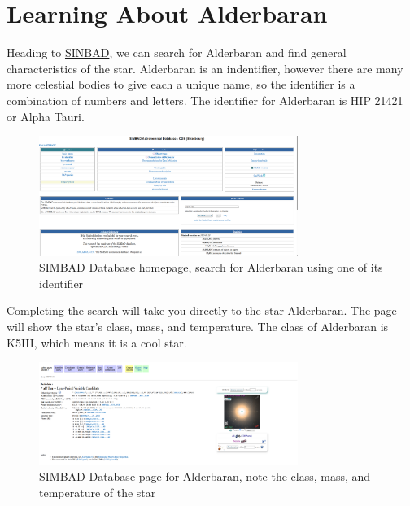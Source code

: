 \documentclass[12pt,oneside,a4paper,english]{article}
\begin{document}
\section{Learning About Alderbaran}
Heading to \href{https://simbad.cds.unistra.fr/simbad/}{SINBAD}, we can search for Alderbaran and find general characteristics of the star. Alderbaran is an indentifier, however there are many more celestial bodies to give each a unique name, so the identifier is a combination of numbers and letters. The identifier for Alderbaran is HIP 21421 or Alpha Tauri.
\begin{figure}[H]
    \centering
    \includegraphics[width=0.75\textwidth]{SINBAD1.png}
    \caption{SIMBAD Database homepage, search for Alderbaran using one of its identifier}
\end{figure}
Completing the search will take you directly to the star Alderbaran. The page will show the star's class, mass, and temperature. The class of Alderbaran is K5III, which means it is a cool star. 
\begin{figure}
    \centering
    \includegraphics[width=0.75\textwidth]{SINBAD2.png}
    \caption{SIMBAD Database page for Alderbaran, note the class, mass, and temperature of the star}
\end{figure}

\label{endOfDoc}
\end{document}
